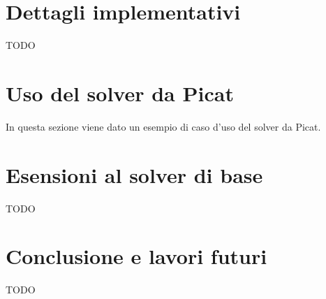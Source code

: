 \documentclass[12pt,a4paper,openright]{book} %
\begin{document}
\chapter{Dettagli implementativi}
TODO

\chapter{Uso del solver \clpset{} da Picat}
In questa sezione viene dato un esempio di caso d'uso del solver \clpset{} da Picat.

\chapter{Esensioni al solver di base}
TODO

\chapter{Conclusione e lavori futuri}
TODO
\end{document}

